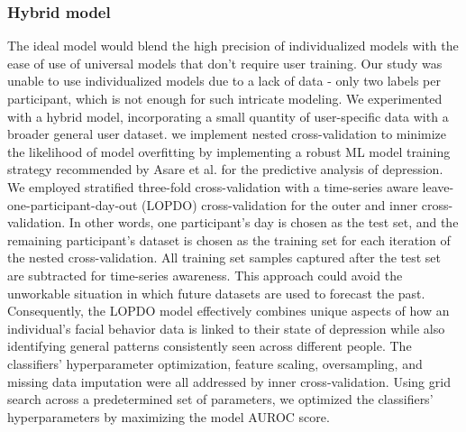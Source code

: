 \subsubsection{Hybrid model}
The ideal model would blend the high precision of individualized models with the ease of use of universal models that don't require user training. Our study was unable to use individualized models due to a lack of data - only two labels per participant, which is not enough for such intricate modeling. We experimented with a hybrid model, incorporating a small quantity of user-specific data with a broader general user dataset. we implement nested cross-validation to minimize the likelihood of model overfitting by implementing a robust ML model training strategy recommended by Asare et al. \cite{opoku2022mood} for the predictive analysis of depression.  We employed stratified three-fold cross-validation with a time-series aware leave-one-participant-day-out (LOPDO) cross-validation for the outer and inner cross-validation. In other words, one participant's day is chosen as the test set, and the remaining participant's dataset is chosen as the training set for each iteration of the nested cross-validation. All training set samples captured after the test set are subtracted for time-series awareness. This approach could avoid the unworkable situation in which future datasets are used to forecast the past. Consequently, the LOPDO model effectively combines unique aspects of how an individual's facial behavior data is linked to their state of depression while also identifying general patterns consistently seen across different people. The classifiers' hyperparameter optimization, feature scaling, oversampling, and missing data imputation were all addressed by inner cross-validation. Using grid search across a predetermined set of parameters, we optimized the classifiers' hyperparameters by maximizing the model AUROC score.









